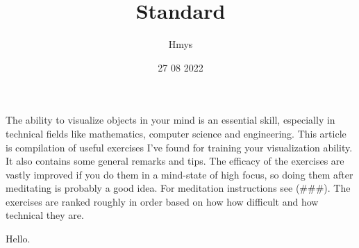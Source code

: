 \title{Standard}
\author{Hmys}
\date{27 08 2022}

\maketitle

The ability to visualize objects in your mind is an essential skill, especially in technical fields like mathematics, computer science and engineering. This article is compilation of useful exercises I've found for training your visualization ability. It also contains some general remarks and tips. The efficacy of the exercises are vastly improved if you do them in a mind-state of high focus, so doing them after meditating is probably a good idea. For meditation instructions see (###). The exercises are ranked roughly in order based on how how difficult and how technical they are.

\par
Hello.



